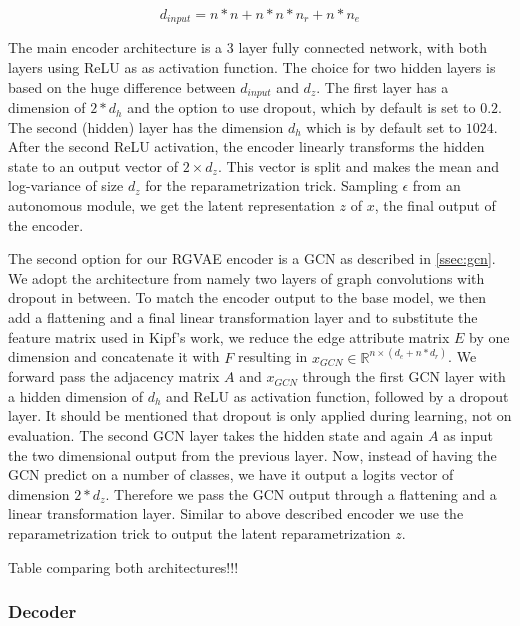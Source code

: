 \begin{equation}
    d_{input} = n*n + n*n*n_r + n*n_e
    \label{eq4:inputdim}
\end{equation}

The main encoder architecture is a 3 layer fully connected network, with both layers using ReLU as as activation function. The choice for two hidden layers is based on the huge difference between $d_{input}$ and $d_z$. The first layer has a dimension of $2*d_h$ and the option to use dropout, which by default is set to $0.2$. The second (hidden) layer has the dimension $d_h$ which is by default set to $1024$. After the second ReLU activation, the encoder linearly transforms the hidden state to an output vector of $2 \times d_z$. This vector is split and makes the mean and log-variance of size $d_z$ for the reparametrization trick. Sampling $\epsilon$ from an autonomous module, we get the latent representation $z$ of $x$,  the final output of the encoder.

The second option for our RGVAE encoder is a GCN as described in \ref{ssec:gcn}. We adopt the architecture from \cite{kipf_semi-supervised_2017} namely two layers of graph convolutions with dropout in between. To match the encoder output to the base model, we then add a flattening and a final linear transformation layer and to substitute the feature matrix used in Kipf's work, we reduce the edge attribute matrix $E$ by one dimension and concatenate it with $F$ resulting in $x_{GCN} \in \mathbb{R}^{n \times (d_e+n*d_r)}$. We forward pass the adjacency matrix $A$ and $x_{GCN}$ through the first GCN layer with a hidden dimension of $d_h$ and ReLU as activation function, followed by a dropout layer. It should be mentioned that dropout is only applied during learning, not on evaluation. The second GCN layer takes the hidden state and again $A$ as input the two dimensional output from the previous layer. Now, instead of having the GCN predict on a number of classes, we have it output a logits vector of dimension $2*d_z$. Therefore we pass the GCN output through a flattening and a linear transformation layer. Similar to above described encoder we use the reparametrization trick to output the latent reparametrization $z$.  


Table comparing both architectures!!!


\subsubsection{Decoder}


